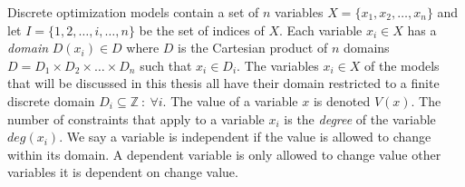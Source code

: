 Discrete optimization models contain a set of $n$ variables $X = \{ x_1, x_2, \dots , x_n \} $ and let $I = 
\{1,2,\dots, i, \dots , n\}$ be 
the set of indices of $X$. Each variable $x_i \in X$ has a \emph{domain} $D(x_i) \in D$ where $D$ is the Cartesian 
product of $n$ domains $D =  D_1 \times D_2 \times \dots\times D_n $ such that $x_i \in D_i$. The variables $x_i \in X$ 
of the models that will be discussed in this thesis all have their domain restricted to a finite discrete domain $D_i 
\subseteq \mathbb{Z}\ : \: \forall i$.  The value of a variable $x$ is denoted $V(x)$. The number of constraints that 
apply to a variable $x_i$ is the \emph{degree} of the variable $deg(x_i)$. We say a variable is 
independent if the value is allowed to change within its domain. A dependent variable is only allowed to change value 
other variables it is dependent on change value. 